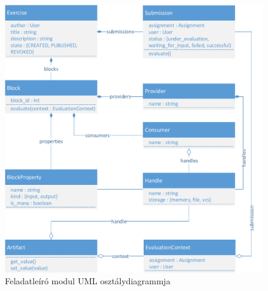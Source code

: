 \begin{figure}[h]
    \centering
    \includegraphics[width=\textwidth]{figures/exercise-uml-cd}
    \smallskip
    \caption{Feladatleíró modul UML osztálydiagrammja}
    \label{figure:exercise-uml-cd}
\end{figure}

